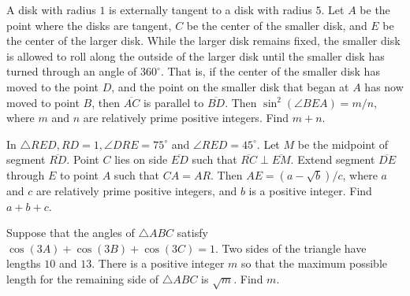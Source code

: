 \documentclass[11pt]{article}
\theoremstyle{definition}
\begin{document}
\begin{question}[name={2014 AIME I, \href{https://artofproblemsolving.com/community/c4p3428804}{Problem 10}}]
	A disk with radius $1$ is externally tangent to a disk with radius $5$. Let $A$ be the point where the disks are tangent, $C$ be the center of the smaller disk, and $E$ be the center of the larger disk. While the larger disk remains fixed, the smaller disk is allowed to roll along the outside of the larger disk until the smaller disk has turned through an angle of $360^\circ$. That is, if the center of the smaller disk has moved to the point $D$, and the point on the smaller disk that began at $A$ has now moved to point $B$, then $\overline{AC}$ is parallel to $\overline{BD}$. Then $\sin^2(\angle BEA)={m}/{n}$, where $m$ and $n$ are relatively prime positive integers. Find $m+n$.
\end{question}


%	









\begin{question}[name={2014 AIME II, \href{https://artofproblemsolving.com/community/c4p3444115}{Problem 11}}]
	In $\triangle RED, RD =1, \angle DRE = 75^\circ$ and $\angle RED = 45^\circ$. Let $M$ be the midpoint of segment $\overline{RD}$. Point $C$ lies on side $\overline{ED}$ such that $\overline{RC} \perp \overline{EM}$. Extend segment $\overline{DE}$ through $E$ to point $A$ such that $CA = AR$. Then $AE = (a-\sqrt{b})/{c}$, where $a$ and $c$ are relatively prime positive integers, and $b$ is a positive integer. Find $a+b+c$.
\end{question}


%	










\begin{question}[name={2014 AIME II, \href{https://artofproblemsolving.com/community/c4p3444116}{Problem 12}}]
	Suppose that the angles of $\triangle ABC$ satisfy $\cos(3A) + \cos(3B) + \cos(3C) = 1$. Two sides of the triangle have lengths $10$ and $13$. There is a positive integer $m$ so that the maximum possible length for the remaining side of $\triangle ABC$ is $\sqrt{m}$. Find $m$.	
\end{question}
\end{document}
